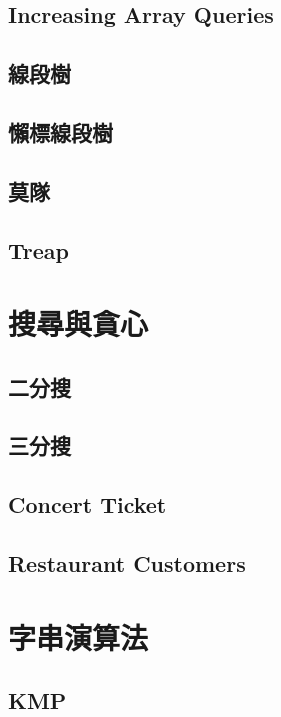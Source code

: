 \subsection{Increasing Array Queries}

\subsection{線段樹}

\subsection{懶標線段樹}

\subsection{莫隊}

\subsection{Treap}


\section{搜尋與貪心}
\subsection{二分搜} 

\subsection{三分搜} 

\subsection{Concert Ticket}

\subsection{Restaurant Customers}


\section{字串演算法}
\subsection{KMP} 

